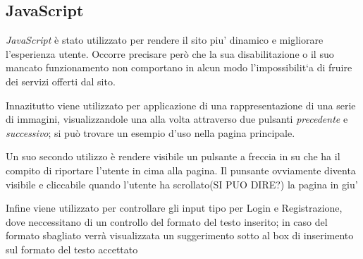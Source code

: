 \subsection{JavaScript}
\textit{JavaScript} è stato utilizzato per rendere il sito piu' dinamico e migliorare l’esperienza utente. Occorre
precisare però che la sua disabilitazione o il suo mancato funzionamento non comportano in alcun
modo l’impossibilit`a di fruire dei servizi offerti dal sito.

Innazitutto viene utilizzato per applicazione di una rappresentazione di una serie di immagini, visualizzandole
una alla volta attraverso due pulsanti \textit{precedente} e \textit{successivo}; si può trovare un esempio d'uso
nella pagina principale.

Un suo secondo utilizzo è rendere visibile un pulsante a freccia in su che ha il compito di riportare l'utente
in cima alla pagina. Il punsante ovviamente diventa visibile e cliccabile quando l'utente ha scrollato(SI PUO DIRE?) la pagina in giu'

Infine viene utilizzato per controllare gli input tipo per Login e Registrazione, dove neccessitano di un controllo del formato
del testo inserito; in caso del formato sbagliato verrà visualizzata un suggerimento sotto al box di inserimento sul formato del
testo accettato